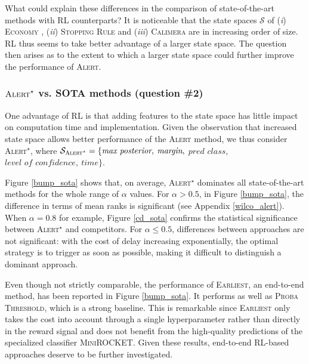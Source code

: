 \documentclass[sigconf, nonacm, table]{acmart}
\begin{document}
What could explain these differences in the comparison of state-of-the-art methods with RL counterparts? It is noticeable that the state spaces $\mathcal{S}$ of (\textit{i}) \textsc{Economy} 
, (\textit{ii}) \textsc{Stopping Rule }
and (\textit{iii}) \textsc{Calimera}
are in increasing order of size. 
RL thus seems to take better advantage of a larger state space. The question then arises as to the extent to which a larger state space could further improve the performance of \textsc{Alert}.



\subsubsection{$\textsc{Alert}^{\star}$ vs. SOTA methods {\bf (question \#2)}}

One advantage of RL is that adding features to the state space has little impact on computation time and implementation. Given the observation that increased state space allows better performance of the \textsc{Alert} method, we thus consider \textsc{Alert$^{\star}$}, where  $\mathcal{S_{\textsc{Alert}^{\star}}} = \{\textit{max posterior},\: \textit{margin},$ $\textit{pred class}$,\: $\textit{level of confidence},\: \textit{time} \}$. 

Figure \ref{bump_sota} shows that, on average, \textsc{Alert$^{\star}$} dominates all state-of-the-art methods for the whole range of $\alpha$ values. For $\alpha > 0.5$, in Figure \ref{bump_sota}, the difference in terms of mean ranks is significant (see Appendix \ref{wilco_alert}). When $\alpha = 0.8$ for example, Figure \ref{cd_sota} confirms the statistical significance between \textsc{Alert$^{\star}$} and competitors. For $\alpha \leq 0.5$, differences between approaches are not significant: %
with the cost of delay increasing exponentially, the optimal strategy is to trigger as soon as possible, making it difficult to distinguish a dominant approach.


Even though not strictly comparable, the performance of \textsc{Earliest}, an end-to-end method, has been reported in Figure \ref{bump_sota}. It performs as well as \textsc{Proba Threshold}, which is a strong baseline. This is remarkable since \textsc{Earliest} only takes the cost into account through a single hyperparameter rather than directly in the reward signal and does not benefit from the high-quality predictions of the specialized classifier \textsc{MiniROCKET}. Given these results, end-to-end RL-based approaches deserve to be further investigated.   
\end{document}

